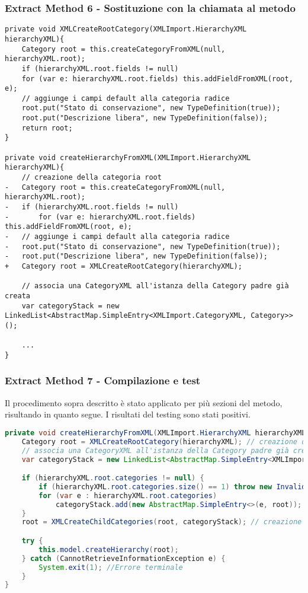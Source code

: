 \begin{frame}[fragile]
    \frametitle{Extract Method 6 - Sostituzione con la chiamata al metodo}
    \begin{lstlisting}[language=tiny_diff]
private void XMLCreateRootCategory(XMLImport.HierarchyXML hierarchyXML){
    Category root = this.createCategoryFromXML(null, hierarchyXML.root);
    if (hierarchyXML.root.fields != null)
    for (var e: hierarchyXML.root.fields) this.addFieldFromXML(root, e);
    // aggiunge i campi default alla categoria radice
    root.put("Stato di conservazione", new TypeDefinition(true));
    root.put("Descrizione libera", new TypeDefinition(false));
    return root;
}

private void createHierarchyFromXML(XMLImport.HierarchyXML hierarchyXML){
    // creazione della categoria root
-   Category root = this.createCategoryFromXML(null, hierarchyXML.root);
-   if (hierarchyXML.root.fields != null)
-       for (var e: hierarchyXML.root.fields) this.addFieldFromXML(root, e);
-   // aggiunge i campi default alla categoria radice
-   root.put("Stato di conservazione", new TypeDefinition(true));
-   root.put("Descrizione libera", new TypeDefinition(false));
+   Category root = XMLCreateRootCategory(hierarchyXML);

    // associa una CategoryXML all'istanza della Category padre già creata
    var categoryStack = new LinkedList<AbstractMap.SimpleEntry<XMLImport.CategoryXML, Category>>();

    ...
}
\end{lstlisting}
\end{frame}

\begin{frame}[fragile]
    \frametitle{Extract Method 7 - Compilazione e test}
    Il procedimento sopra descritto è stato applicato per più sezioni del metodo, risultando in quanto segue. I risultati del testing sono stati positivi.
\lstset{style=tiny_java}
\begin{lstlisting}[language=java, caption={Refactor del metodo Controller\#createHierarchyFromXML()}]
private void createHierarchyFromXML(XMLImport.HierarchyXML hierarchyXML){
    Category root = XMLCreateRootCategory(hierarchyXML); // creazione della categoria root
    // associa una CategoryXML all'istanza della Category padre già creata
    var categoryStack = new LinkedList<AbstractMap.SimpleEntry<XMLImport.CategoryXML, Category>>();

    if (hierarchyXML.root.categories != null) {
        if (hierarchyXML.root.categories.size() == 1) throw new InvalidCategoryException();
        for (var e : hierarchyXML.root.categories)
            categoryStack.add(new AbstractMap.SimpleEntry<>(e, root));
    }
    root = XMLCreateChildCategories(root, categoryStack); // creazione delle categorie figlie

    try {
        this.model.createHierarchy(root);
    } catch (CannotRetrieveInformationException e) {
        System.exit(1); //Errore terminale
    }
}
\end{lstlisting}
\end{frame}